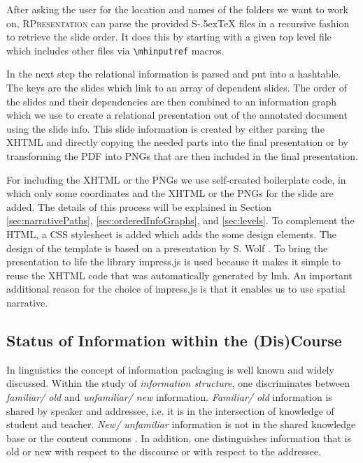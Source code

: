 \documentclass{llncs}
\def\stex{\texorpdfstring{\raisebox{-.5ex}S\kern-.5ex\TeX}{sTeX}\xspace}
\newcommand{\sys}{\textsc{RPresentation}\xspace}
\begin{document}
After asking the user for the location and names of the folders we want to work on, \sys
can parse the provided \stex files in a recursive fashion to retrieve the slide order. It
does this by starting with a given top level file which includes other files via
\texttt{\textbackslash mhinputref} macros.

In the next step the relational information is parsed and put into a hashtable. The keys are the slides which link to an array of dependent slides. The order of the slides and their dependencies are then combined to an information graph which we use to create a relational presentation out of the annotated document using the slide info. This slide information is created by either parsing the XHTML and directly copying the needed parts into the final presentation or by transforming the PDF into PNGs that are then included in the final presentation.

For including the XHTML or the PNGs we use self-created boilerplate code, in which only
some coordinates and the XHTML or the PNGs for the slide are added. The details of this
process will be explained in Section \ref{sec:narrativePaths},
\ref{sec:orderedInfoGraphs}, and \ref{sec:levels}. To complement the HTML, a CSS
stylesheet is added which adds the some design elements. The design of the template is
based on a presentation by S. Wolf \cite{Wolf:npentrel15}. To bring the presentation to
life the library impress.js is used because it makes it simple to reuse the XHTML code
that was automatically generated by lmh. An important additional reason for the choice of
impress.js \cite{JSImpress:npentrel14} is that it enables us to use spatial narrative.

\subsection{Status of Information within the (Dis)Course}
\label{sec:infostatus}
In linguistics the concept of information packaging \cite{CambridgeGrammar:npentrel14} is well known and widely discussed. Within the study of \textit{information structure}, one discriminates between \textit{familiar/ old} and \textit{unfamiliar/ new} information. \textit{Familiar/ old} information is shared by speaker and addressee, i.e. it is in the intersection of knowledge of student and teacher. \textit{New/ unfamiliar} information is not in the shared knowledge base or the content commons \cite{CNX:whitepaper}. In addition, one distinguishes information that is old or new with respect to the discourse or with respect to the addressee.
\end{document}
